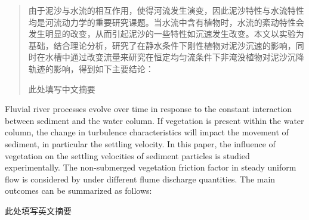
\begin{abstract}
	\linespread{1.5}
由于泥沙与水流的相互作用，使得河流发生演变，因此泥沙特性与水流特性均是河流动力学的重要研究课题。当水流中含有植物时，水流的紊动特性会发生明显的改变，从而引起泥沙的一些特性如沉速发生改变。本文以实验为基础，结合理论分析，研究了在静水条件下刚性植物对泥沙沉速的影响，同时在水槽中通过改变流量来研究在恒定均匀流条件下非淹没植物对泥沙沉降轨迹的影响，得到如下主要结论：

此处填写中文摘要

\end{abstract}


\begin{enabstract}
	\linespread{1.5}
Fluvial river processes evolve over time in response to the constant interaction between sediment and the water column. If vegetation is present within the water column, the change in turbulence characteristics will impact the movement of sediment, in particular the settling velocity. In this paper, the influence of vegetation on the settling velocities of sediment particles is studied experimentally. The  non-submerged vegetation friction factor in steady uniform flow is considered by under different flume discharge quantities. The main outcomes can be summarized as follows:

此处填写英文摘要


\end{enabstract}
